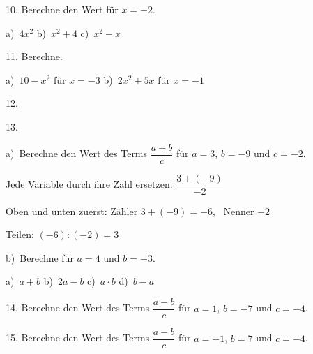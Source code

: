 \documentclass[11pt]{article}
\newcommand{\grau}[1]{{\color{mbgrau}#1}}
\begin{document}
\begin{pfaufg}{}{10.}{}
Berechne den Wert für $x = -2$. \par\vspace{3pt} a)~$4x^2$ \qquad b)~$x^2 + 4$ \qquad c)~$x^2 - x$
\end{pfaufg}

\begin{pfaufg}{}{11.}{}
Berechne. \par\vspace{3pt} a)~$10 - x^2$ für $x = -3$ \qquad b)~$2x^2 + 5x$ für $x = -1$
\end{pfaufg}

\begin{pfaufg}{}{12.}{}
\end{pfaufg}

\begin{pfaufg}{}{13.}{}
\grau{a)\ Berechne den Wert des Terms $\dfrac{a + b}{c}$ für $a = 3$, $b = -9$ und $c = -2$.\par\smallskip Jede Variable durch ihre Zahl ersetzen: \quad $\dfrac{3 + (-9)}{-2}$\par Oben und unten zuerst: \quad Zähler $3 + (-9) = -6$, \ Nenner $-2$\par Teilen: \quad $(-6) : (-2) = 3$}
\par\medskip
b)\ Berechne für $a = 4$ und $b = -3$. \par\vspace{3pt} a)~$a + b$ \qquad b)~$2a - b$ \qquad c)~$a \cdot b$ \qquad d)~$b - a$
\end{pfaufg}

\begin{pfaufg}{}{14.}{}
Berechne den Wert des Terms $\dfrac{a - b}{c}$ für $a = 1$, $b = -7$ und $c = -4$.
\end{pfaufg}

\begin{pfaufg}{}{15.}{}
Berechne den Wert des Terms $\dfrac{a - b}{c}$ für $a = -1$, $b = 7$ und $c = -4$.
\end{pfaufg}
\end{document}
